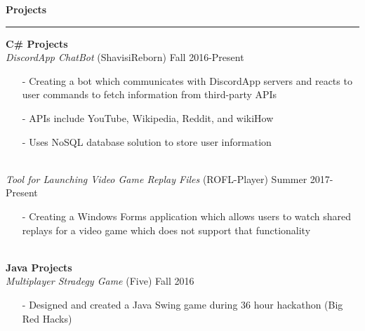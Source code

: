 \documentclass[11pt]{article}
\newcommand{\Hrule}{\vspace{1mm}\hrule\vspace{1mm}}
\newcommand{\Indent}{\indent\indent}
\begin{document}
    \noindent\large\textbf{Projects}
    \Hrule
        \indent \small\textbf{C\# Projects}\\
            \Indent \small\textit{DiscordApp ChatBot}\small{ (ShavisiReborn)} \hfill \small{Fall 2016-Present}\indent\\
                \Indent\begin{minipage}{\dimexpr\textwidth-6cm}
                    \begin{itemize}[noitemsep, topsep=0pt]
                        \item[-] Creating a bot which communicates with DiscordApp servers and reacts to user commands to fetch information from third-party APIs
                        \item[-] APIs include YouTube, Wikipedia, Reddit, and wikiHow
                        \item[-] Uses NoSQL database solution to store user information
                    \end{itemize}\vspace{0mm}
                \end{minipage}\\
            \Indent \small\textit{Tool for Launching Video Game Replay Files}\small{ (ROFL-Player)} \hfill \small{Summer 2017-Present}\indent\vspace{0.5mm}\\
                \Indent\begin{minipage}{\dimexpr\textwidth-6cm}
                    \begin{itemize}[noitemsep, topsep=0pt]
                        \item[-] Creating a Windows Forms application which allows users to watch shared replays for a video game which does not support that functionality
                    \end{itemize}\vspace{0mm}
                \end{minipage}\\
        \indent \small\textbf{Java Projects}\\
            \Indent \small\textit{Multiplayer Stradegy Game}\small{ (Five)} \hfill \small{Fall 2016}\indent\vspace{0.5mm}\\
                \Indent\begin{minipage}{\dimexpr\textwidth-6cm}
                    \begin{itemize}[noitemsep, topsep=0pt]
                        \item[-] Designed and created a Java Swing game during 36 hour hackathon (Big Red Hacks)
                    \end{itemize}\vspace{0mm}
                \end{minipage}\\
\end{document}
